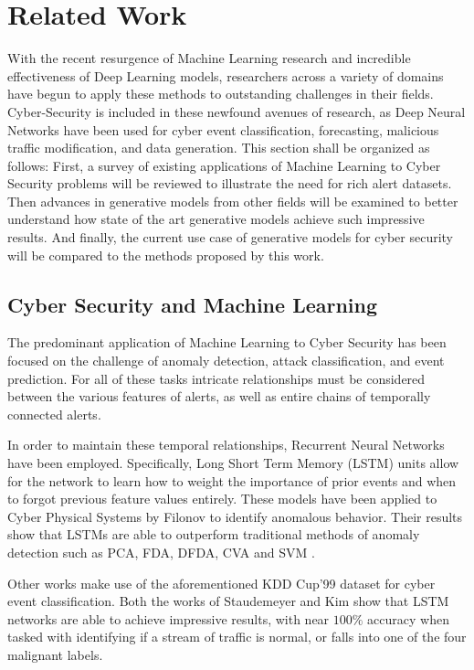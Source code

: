 
\chapter{Related Work}

With the recent resurgence of Machine Learning research and incredible effectiveness of Deep Learning models, researchers across a variety of domains have begun to apply these methods to outstanding challenges in their fields. Cyber-Security is included in these newfound avenues of research, as Deep Neural Networks have been used for cyber event classification, forecasting, malicious traffic modification, and data generation. This section shall be organized as follows: First, a survey of existing applications of Machine Learning to Cyber Security problems will be reviewed to illustrate the need for rich alert datasets. Then advances in generative models from other fields will be examined to better understand how state of the art generative models achieve such impressive results. And finally, the current use case of generative models for cyber security will be compared to the methods proposed by this work. 

\section{Cyber Security and Machine Learning}

The predominant application of Machine Learning to Cyber Security has been focused on the challenge of anomaly detection, attack classification, and event prediction. For all of these tasks intricate relationships must be considered between the various features of alerts, as well as entire chains of temporally connected alerts. 

In order to maintain these temporal relationships, Recurrent Neural Networks have been employed. Specifically, Long Short Term Memory (LSTM) units allow for the network to learn how to weight the importance of prior events and when to forgot previous feature values entirely. These models have been applied to Cyber Physical Systems by Filonov \etal  to identify anomalous behavior. Their results show that LSTMs are able to outperform traditional methods of anomaly detection such as PCA, FDA, DFDA, CVA and SVM \cite{Filonov2016, Filonov2017}.

Other works make use of the aforementioned KDD Cup'99 dataset for cyber event classification. Both the works of Staudemeyer \etal \cite{Staudemeyer} and Kim \etal \cite{Kim} show that LSTM networks are able to achieve impressive results, with near $100\%$ accuracy when tasked with identifying if a stream of traffic is normal, or falls into one of the four malignant labels. 

